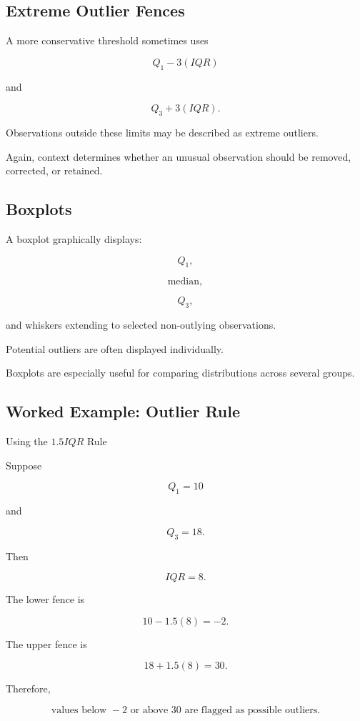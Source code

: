 \subsection{Extreme Outlier Fences}
\label{subsec:extreme-outlier-fences}

A more conservative threshold sometimes uses

\[
\boxed{
Q_1-3(IQR)
}
\]

and

\[
\boxed{
Q_3+3(IQR).
}
\]

Observations outside these limits may be described as extreme outliers.

Again, context determines whether an unusual observation should be
removed, corrected, or retained.

\subsection{Boxplots}
\label{subsec:boxplots}

A boxplot graphically displays:

\[
Q_1,
\]

\[
\text{median},
\]

\[
Q_3,
\]

and whiskers extending to selected non-outlying observations.

Potential outliers are often displayed individually.

Boxplots are especially useful for comparing distributions across
several groups.

\subsection{Worked Example: Outlier Rule}
\label{subsec:worked-outlier-rule}

\begin{workedexamplebox}{Using the \(1.5IQR\) Rule}

Suppose

\[
Q_1=10
\]

and

\[
Q_3=18.
\]

Then

\[
IQR=8.
\]

The lower fence is

\[
10-1.5(8)
=
-2.
\]

The upper fence is

\[
18+1.5(8)
=
30.
\]

Therefore,

\begin{answerbox}
\[
\boxed{
\text{values below }-2
\text{ or above }30
\text{ are flagged as possible outliers}.
}
\]
\end{answerbox}

\end{workedexamplebox}

